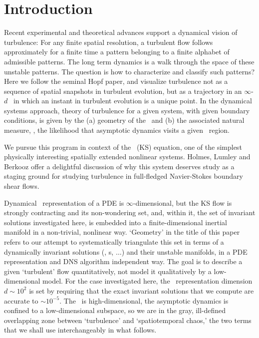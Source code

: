 

\section{Introduction}

Recent experimental and theoretical advances
support a dynamical vision of turbulence:
For any finite  spatial resolution,
a turbulent flow follows approximately for a finite time
a pattern belonging to a
{ finite alphabet}
of admissible patterns.
The long term dynamics is
a {walk through the space of these unstable patterns}.
The question is how to characterize and classify such patterns?
Here we follow the seminal Hopf paper, and  visualize
turbulence not as  a sequence of
spatial snapshots in turbulent evolution,
but as a trajectory in an
 $\infty$-$d$ \statesp\ in which an
instant in turbulent evolution is
a {unique} point. In the dynamical systems approach,
theory of turbulence for a given system, with given boundary conditions,
is given by the
(a) geometry of the \statesp\ and (b) the associated natural measure,
\ie,
the likelihood that asymptotic dynamics visits a given \statesp\ region.

We pursue this program in context of the \KS\ (KS) equation, %
one of the simplest physically interesting spatially extended
nonlinear systems.  Holmes, Lumley and Berkooz offer a
delightful discussion of why this system deserves study as a staging
ground for studying turbulence in full-fledged Navier-Stokes
boundary shear flows.

Dynamical \statesp\ representation of a PDE is $\infty$-dimensional,
but the KS flow is strongly contracting and its non-wondering set,
and, within it, the set of invariant solutions investigated here, is
embedded into a finite-dimensional inertial manifold in
a non-trivial, nonlinear way. `Geometry' in the title of this paper
refers to our attempt to systematically triangulate this set in
terms of a dynamically invariant solutions (\eqva, \po s, $\ldots$)
and their unstable manifolds, in a PDE representation and DNS algorithm  
independent way. The goal is to describe a given
`turbulent' flow quantitatively, not model it qualitatively by a
low-dimensional model. For the case investigated here, the \statesp\
representation dimension $d \sim 10^2$ is set by requiring that the
exact invariant solutions that we compute are accurate to $\sim
10^{-5}$.
The \statesp\ is high-dimensional, the asymptotic dynamics is
confined to a low-dimensional subspace, so we are in the gray,
ill-defined overlapping zone between `turbulence'
and `spatiotemporal chaos,' the two terms that we shall use
interchangeably in what follows.

